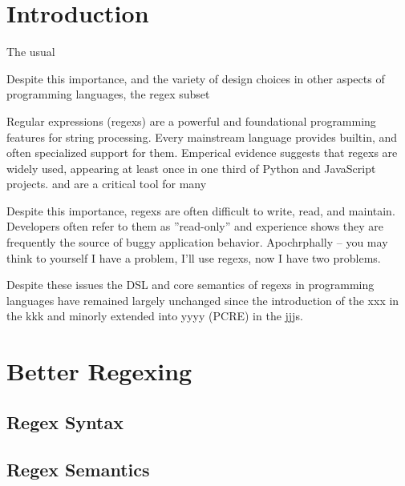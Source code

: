 \documentclass[sigplan,10pt,review,anonymous]{acmart}
\begin{document}


\maketitle

\cite{bosque}

\section{Introduction}
The usual

Despite this importance, and the variety of design choices in other aspects of programming languages, the regex 
subset  


  Regular expressions (regexs) are a powerful and foundational programming features for string processing. Every mainstream language provides 
builtin, and often specialized support for them. Emperical evidence suggests that regexs are widely used, appearing at least once in 
one third of Python and JavaScript projects.  and are a critical tool for many

Despite this importance, regexs are often difficult to write, read, and maintain. Developers often refer to them as ''read-only'' and 
experience shows they are frequently the source of buggy application behavior. 
Apochrphally -- you may think to yourself I have a problem, I'll use regexs, now I have two problems. 

Despite these issues the DSL and core semantics of regexs in programming languages have remained largely unchanged since the 
introduction of the xxx in the kkk and minorly extended into yyyy (PCRE) in the jjjs.

\section{Better Regexing}

\subsection{Regex Syntax}

\subsection{Regex Semantics}
\end{document}
